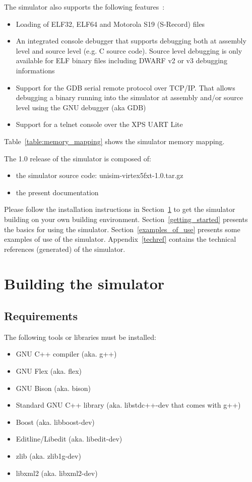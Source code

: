 \cleardoublepage

\noindent The simulator also supports the following features :
\begin{itemize}
\item Loading of ELF32, ELF64 \cite{ELF} and Motorola S19 (S-Record) \cite{S19} files
\item An integrated console debugger that supports debugging both at assembly level and source level (e.g. C source code). Source level debugging is only available for ELF binary files including DWARF v2 or v3 \cite{DWARF3} debugging informations
\item Support for the GDB \cite{GDB} serial remote protocol over TCP/IP. That allows debugging a binary running into the simulator at assembly and/or source level using the GNU debugger (aka GDB)
\item Support for a telnet console over the XPS UART Lite
\end{itemize}

Table~\ref{table:memory_mapping} shows the simulator memory mapping.

\noindent The 1.0 release of the simulator is composed of:
\begin{itemize}
\item the simulator source code: unisim-virtex5fxt-1.0.tar.gz
\item the present documentation
\end{itemize}

Please follow the installation instructions in Section~\ref{building_simulator} to get the simulator building on your own building environment.
Section~\ref{getting_started} presents the basics for using the simulator.
Section~\ref{examples_of_use} presents some examples of use of the simulator.
Appendix~\ref{techref} contains the technical references (generated) of the simulator.

\section{Building the simulator}
\label{building_simulator}

\subsection{Requirements}

\noindent The following tools or libraries must be installed:
\begin{itemize}
\item GNU C++ compiler (aka. g++)
\item GNU Flex (aka. flex)
\item GNU Bison (aka. bison)
\item Standard GNU C++ library (aka. libstdc++-dev that comes with g++)
\item Boost (aka. libboost-dev)
\item Editline/Libedit (aka. libedit-dev)
\item zlib (aka. zlib1g-dev)
\item libxml2 (aka. libxml2-dev)
\end{itemize}


